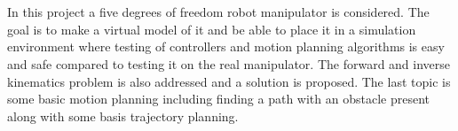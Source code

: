 \chapter*{\englishabstractname}
In this project a five degrees of freedom robot manipulator is considered. The goal is to make a virtual model of it and be able to place it in a simulation environment where testing of controllers and motion planning algorithms is easy and safe compared to testing it on the real manipulator. The forward and inverse kinematics problem is also addressed and a solution is proposed. The last topic is some basic motion planning including finding a path with an obstacle present along with some basis trajectory planning. %
\clearpage
